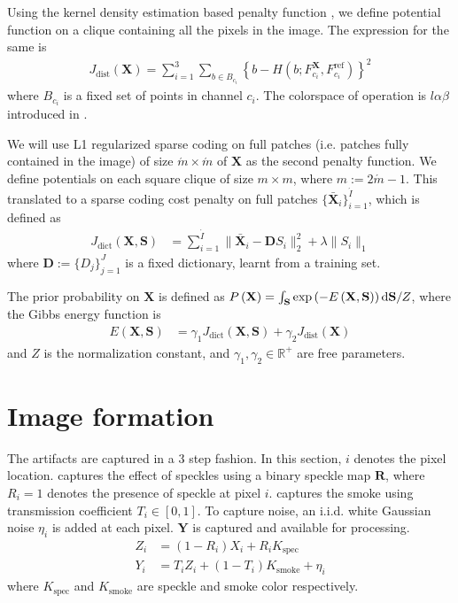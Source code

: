 Using the kernel density estimation based penalty function , we define potential function on a clique containing all the pixels in the image. The expression for the same is
\begin{align}
J_\text{dist}(\mathbf{X}) = \sum_{i=1}^{3} \sum_{b \in B_{c_i}} \left\lbrace b - H \left( b; F^\mathbf{X}_{c_i}, F^\text{ref}_{c_i} \right) \right\rbrace^2 \label{eqn:cost_kde}
\end{align}
where $B_{c_i}$ is a fixed set of points in channel $c_i$. The colorspace of operation is $l\alpha\beta$ introduced in .

We will use L1 regularized sparse coding on full patches (i.e. patches fully contained in the image) of size $\acute{m} \times \acute{m}$ of $\mathbf{X}$ as the second penalty function. We define potentials on each square clique of size $m \times m$, where $m := 2\acute{m} - 1$. This translated to a sparse coding cost penalty on full patches $\lbrace \mathbf{\bar X}_i \rbrace_{i=1}^{\acute{I}}$, which is defined as
\begin{align}
    J_\text{dict} \left( \mathbf{X}, \mathbf{S} \right) &= \sum_{i=1}^{\acute{I}} \| \mathbf{\bar X}_i - \mathbf{D} S_i \|_2^2 + \lambda \| S_i \|_1 \label{eqn:dictCost}
\end{align}
where $\mathbf{D} := \lbrace D_j \rbrace_{j=1}^{J}$ is a fixed dictionary, learnt from a training set.

The prior probability on $\mathbf{X}$ is defined as $P\left( \mathbf{X} \right) = \int_{\mathbf{S}} \exp \left( -E\left(\mathbf{X}, \mathbf{S} \right) \right) \mathop{}\!\mathrm{d} \mathbf{S} / Z$, where the Gibbs energy function is
\begin{align}
    E \left(\mathbf{X}, \mathbf{S} \right) &= \gamma_1 J_\text{dict} \left( \mathbf{X}, \mathbf{S} \right) + \gamma_2 J_\text{dist} \left( \mathbf{X} \right)
\end{align}
and $Z$ is the normalization constant, and $\gamma_1, \gamma_2 \in \mathbb{R}^+$ are free parameters.

\section{Image formation}
\label{sec:imgformation}
The artifacts are captured in a 3 step fashion. In this section, $i$ denotes the pixel location.  captures the effect of speckles using a binary speckle map $\mathbf{R}$, where $R_i = 1$ denotes the presence of speckle at pixel $i$.  captures the smoke using transmission coefficient $T_i \in [0, 1]$. To capture noise, an i.i.d. white Gaussian noise $\eta_i$ is added at each pixel. $\mathbf{Y}$ is captured and available for processing.
\begin{align}
Z_i &= (1 - R_i) X_i  + R_i K_\text{spec} \label{eqn:speckle} \\
Y_i &= T_i Z_i + (1 - T_i) K_\text{smoke} + \eta_i \label{eqn:smokenoise}
\end{align}
where $K_\text{spec}$ and $K_\text{smoke}$ are speckle and smoke color respectively.


